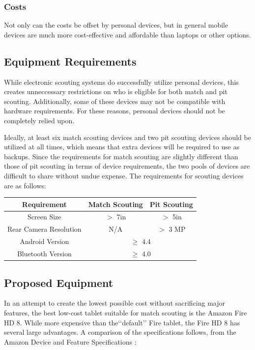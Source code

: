 \documentclass[11pt]{report}
\begin{document}
\subsubsection*{Costs}

Not only can the costs be offset by personal devices, but in general mobile devices are much more cost-effective and affordable than laptops or other options.

\subsection{Equipment Requirements}

While electronic scouting systems do successfully utilize personal devices, this creates unneccessary restrictions on who is eligible for both match and pit scouting. Additionally, some of these devices may not be compatible with hardware requirements. For these reasons, personal devices should not be completely relied upon. \newline

Ideally, at least six match scouting devices and two pit scouting devices should be utilized at all times, which means that extra devices will be required to use as backups. Since the requirements for match scouting are slightly different than those of pit scouting in terms of device requirements, the two pools of devices are difficult to share without undue expense. The requirements for scouting devices are as follows: 

\begin{center}
 \begin{tabular}{||c|c|c||} 
 \hline
 Requirement & Match Scouting & Pit Scouting \\  [0.5ex] 
 \hline \hline
 Screen Size & $>$ 7in & $>$ 5in \\ 
 \hline
 Rear Camera Resolution & N/A & $>$ 3 MP \\ 
 \hline
 Android Version & \multicolumn{2}{|c||}{$\geq$ 4.4}  \\
 \hline
 Bluetooth Version & \multicolumn{2}{|c||}{$\geq$ 4.0} \\  [1ex] 
 \hline
\end{tabular}
\end{center}

\subsection{Proposed Equipment}

In an attempt to create the lowest possible cost without sacrificing major features, the best low-cost tablet suitable for match scouting is the Amazon Fire HD 8. While more expensive than the\lq\lq{default}\rq\rq{} Fire tablet, the Fire HD 8 has several large advantages. A comparison of the specifications follows, from the Amazon Device and Feature Specifications \cite{amazondevicespec}:

\printbibliography[heading=bibintoc]
\end{document}
